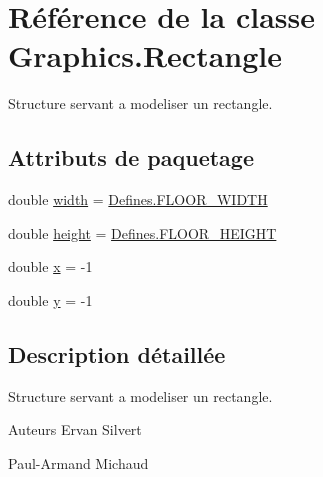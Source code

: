 \hypertarget{classGraphics_1_1Rectangle}{\section{Référence de la classe Graphics.\-Rectangle}
\label{classGraphics_1_1Rectangle}
}


Structure servant a modeliser un rectangle.  


\subsection*{Attributs de paquetage}
\begin{DoxyCompactItemize}
\item 
double \hyperlink{classGraphics_1_1Rectangle_a1e658c4befb00cda16cc96da9b203ad2}{width} = \hyperlink{classDefines_ad5528ce6b91911a4ca4e9f364543ef9c}{Defines.\-F\-L\-O\-O\-R\-\_\-\-W\-I\-D\-T\-H}
\item 
double \hyperlink{classGraphics_1_1Rectangle_a60cd0ad543999184cc40a0573478f05d}{height} = \hyperlink{classDefines_a2a43fe315bf385b8693c70fbf824a3d0}{Defines.\-F\-L\-O\-O\-R\-\_\-\-H\-E\-I\-G\-H\-T}
\item 
double \hyperlink{classGraphics_1_1Rectangle_a7820ea5e4a3f891556e31d0be0704eb5}{x} = -\/1
\item 
double \hyperlink{classGraphics_1_1Rectangle_ac0506420ae549a073b1e9c65e23ed478}{y} = -\/1
\end{DoxyCompactItemize}


\subsection{Description détaillée}
Structure servant a modeliser un rectangle. 

\begin{DoxyAuthor}{Auteurs}
Ervan Silvert 

Paul-\/\-Armand Michaud 
\end{DoxyAuthor}


